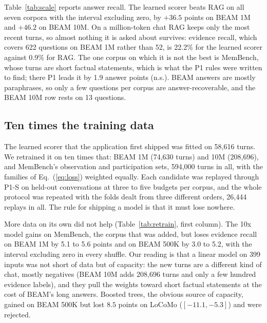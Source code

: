 Table~\ref{tab:scale} reports answer recall. The learned scorer beats RAG on
all seven corpora with the interval excluding zero, by $+36.5$ points on BEAM
1M and $+46.2$ on BEAM 10M. On a million-token chat RAG keeps only the most
recent turns, so almost nothing it is asked about survives: evidence recall,
which covers 622 questions on BEAM 1M rather than 52, is 22.2\% for the
learned scorer against 0.9\% for RAG. The one corpus on which it is not the
best is MemBench, whose turns are short factual statements, which is what the
P1 rules were written to find; there P1 leads it by 1.9 answer points (n.s.).
BEAM answers are mostly paraphrases, so only a few questions per corpus are
answer-recoverable, and the BEAM 10M row rests on 13 questions.

\begin{table}[t]
\caption{Held-out answer recall (\%) at each corpus's own store budget, 5-fold
by conversation. P3$_{12}$ is the PR~\#12 recipe (LoCoMo, REALTALK, BEAM
100K/500K), refitted without the held-out fold; P3$_{\mathrm{ship}}$ is the
shipped ensemble of Section~\ref{sec:retrain}, under the same protocol. $n$ is
the number of answer-recoverable questions. Bold: the 95\% interval, resampled
by conversation, excludes zero. $^\ddagger$PersonaChat validation dialogues,
never trained on; queries are the persona lines, a proxy described in
Section~\ref{sec:retrain}.}
\label{tab:scale}
\centering
\small
\begin{adjustbox}{max width=\textwidth}

\end{adjustbox}
\end{table}

\subsection{Ten times the training data}
\label{sec:retrain}

The learned scorer that the application first shipped was fitted on 58,616
turns. We retrained it on ten times that: BEAM 1M (74,630 turns) and 10M
(208,696), and MemBench's observation and participation sets, 594,000 turns
in all, with the families of Eq.~(\ref{eq:loss}) weighted equally. Each
candidate was replayed through P1-S on held-out conversations at three to
five budgets per corpus, and the whole protocol was repeated with the folds
dealt from three different orders, 26,444 replays in all. The rule for
shipping a model is that it must lose nowhere.

More data on its own did not help (Table~\ref{tab:retrain}, first column). The
10x model gains on MemBench, the corpus that was added, but loses evidence
recall on BEAM 1M by 5.1 to 5.6 points and on BEAM 500K by 3.0 to 5.2, with
the interval excluding zero in every shuffle. Our reading is that a linear
model on 399 inputs was not short of data but of capacity: the new turns are
a different kind of chat, mostly negatives (BEAM 10M adds 208,696 turns and
only a few hundred evidence labels), and they pull the weights toward short
factual statements at the cost of BEAM's long answers. Boosted trees, the
obvious source of capacity, gained on BEAM 500K but lost $8.5$ points on
LoCoMo ($[-11.1,-5.3]$) and were rejected.

